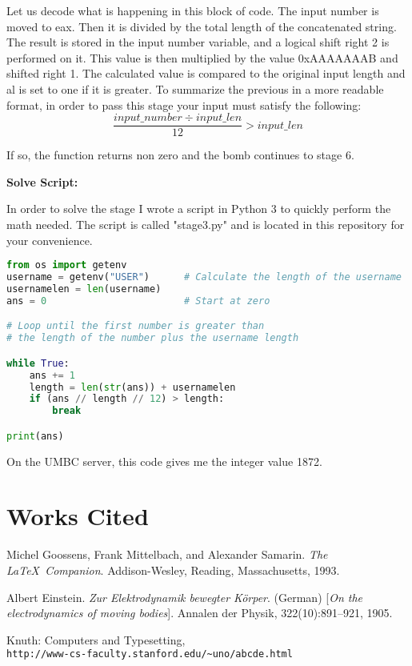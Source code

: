 \documentclass{article}
\begin{document}
Let us decode what is happening in this block of code.  The input number is 
moved to eax.  Then it is divided by the total length of the concatenated
string.  The result is stored in the input number variable, and a logical 
shift right 2 is performed on it.  This value is then multiplied by the value
0xAAAAAAAB and shifted right 1.  The calculated value is compared to the 
original input length and al is set to one if it is greater.  To summarize 
the previous in a more readable format, in order to pass this stage your input
must satisfy the following:
\[ \frac{input\_number\div input\_len}{12} > input\_len\]
\par
If so, the function returns non zero and the bomb continues to stage 6.

\begin{flushleft}
\textbf{Solve Script:}
\vspace{.5pc}
\end{flushleft}
\par
In order to solve the stage I wrote a script in Python 3 to quickly perform 
the math needed.  The script is called "stage3.py" and is located in this
repository for your convenience.  

\begin{lstlisting}[language=Python]
from os import getenv
username = getenv("USER")      # Calculate the length of the username
usernamelen = len(username)
ans = 0                        # Start at zero

# Loop until the first number is greater than
# the length of the number plus the username length

while True:
    ans += 1                   
    length = len(str(ans)) + usernamelen   
    if (ans // length // 12) > length:
        break

print(ans)
\end{lstlisting}
\par
On the UMBC server, this code gives me the integer value 1872.

\newpage
\section{Works Cited}
\begin{thebibliography}{9}
Michel Goossens, Frank Mittelbach, and Alexander Samarin. 
\textit{The \LaTeX\ Companion}. 
Addison-Wesley, Reading, Massachusetts, 1993.
 
Albert Einstein. 
\textit{Zur Elektrodynamik bewegter K{\"o}rper}. (German) 
[\textit{On the electrodynamics of moving bodies}]. 
Annalen der Physik, 322(10):891–921, 1905.
 
Knuth: Computers and Typesetting,
\\\texttt{http://www-cs-faculty.stanford.edu/\~{}uno/abcde.html}
\end{thebibliography}
\end{document}
